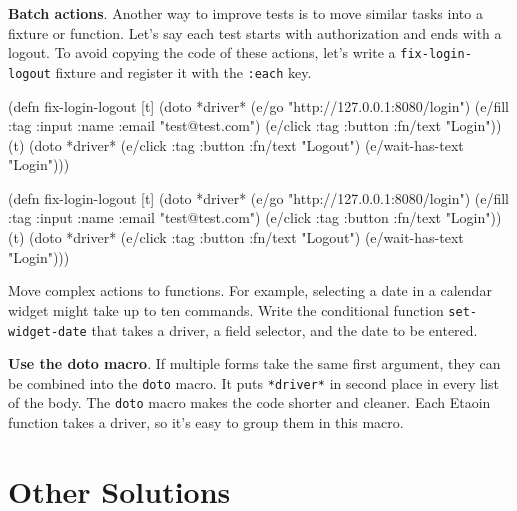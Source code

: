 \textbf{Batch actions}. Another way to improve tests is to move similar tasks into a fixture or function. Let's say each test starts with authorization and ends with a logout. To avoid copying the code of these actions, let's write a \verb|fix-login-logout| fixture and register it with the \verb|:each| key.

\ifnarrow

\begin{english}
  \begin{clojure}
(defn fix-login-logout [t]
  (doto *driver*
    (e/go "http://127.0.0.1:8080/login")
    (e/fill {:tag :input :name :email}
      "test@test.com")
    (e/click
      {:tag :button :fn/text "Login"}))
  (t)
  (doto *driver*
    (e/click {:tag :button
              :fn/text "Logout"})
    (e/wait-has-text "Login")))
  \end{clojure}
\end{english}

\else

\begin{english}
  \begin{clojure}
(defn fix-login-logout [t]
  (doto *driver*
    (e/go "http://127.0.0.1:8080/login")
    (e/fill {:tag :input
             :name :email} "test@test.com")
    (e/click {:tag :button
              :fn/text "Login"}))
  (t)
  (doto *driver*
    (e/click {:tag :button
              :fn/text "Logout"})
    (e/wait-has-text "Login")))
  \end{clojure}
\end{english}

\fi

Move complex actions to functions. For example, selecting a date in a calendar widget might take up to ten commands. Write the conditional function \verb|set-widget-date| that takes a driver, a field selector, and the date to be entered.


\textbf{Use the doto macro}. If multiple forms take the same first argument, they can be combined into the \verb|doto| macro. It puts \verb|*driver*| in second place in every list of the body. The \verb|doto| macro makes the code shorter and cleaner. Each Etaoin function takes a driver, so it's easy to group them in this macro.

\section{Other Solutions}

